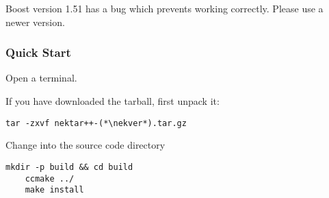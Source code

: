 \begin{warningbox}
Boost version 1.51 has a bug which prevents \nekpp working correctly.
Please use a newer version.
\end{warningbox}


\subsubsection{Quick Start}
Open a terminal.

If you have downloaded the tarball, first unpack it:
\begin{lstlisting}[style=BashInputStyle]
tar -zxvf nektar++-(*\nekver*).tar.gz
\end{lstlisting}
Change into the  source code directory
\begin{lstlisting}[style=BashInputStyle]
    mkdir -p build && cd build 
    ccmake ../
    make install
\end{lstlisting}

